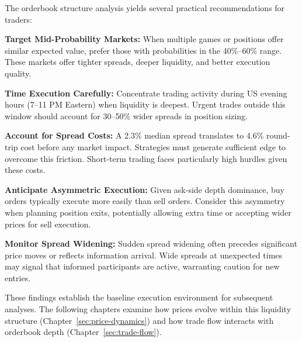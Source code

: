 The orderbook structure analysis yields several practical recommendations for traders:

\textbf{Target Mid-Probability Markets:} When multiple games or positions offer similar expected value, prefer those with probabilities in the 40\%--60\% range. These markets offer tighter spreads, deeper liquidity, and better execution quality.

\textbf{Time Execution Carefully:} Concentrate trading activity during US evening hours (7--11 PM Eastern) when liquidity is deepest. Urgent trades outside this window should account for 30--50\% wider spreads in position sizing.

\textbf{Account for Spread Costs:} A 2.3\% median spread translates to 4.6\% round-trip cost before any market impact. Strategies must generate sufficient edge to overcome this friction. Short-term trading faces particularly high hurdles given these costs.

\textbf{Anticipate Asymmetric Execution:} Given ask-side depth dominance, buy orders typically execute more easily than sell orders. Consider this asymmetry when planning position exits, potentially allowing extra time or accepting wider prices for sell execution.

\textbf{Monitor Spread Widening:} Sudden spread widening often precedes significant price moves or reflects information arrival. Wide spreads at unexpected times may signal that informed participants are active, warranting caution for new entries.

These findings establish the baseline execution environment for subsequent analyses. The following chapters examine how prices evolve within this liquidity structure (Chapter~\ref{sec:price-dynamics}) and how trade flow interacts with orderbook depth (Chapter~\ref{sec:trade-flow}).

